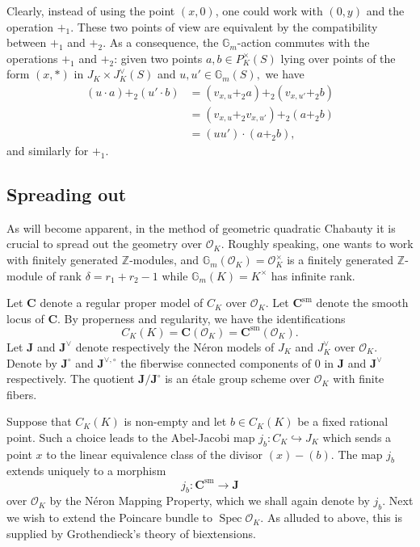 \documentclass[11pt,oneside]{amsart}
\theoremstyle{plain}
\theoremstyle{definition}
\def\G{{\bf G}}
\DeclareMathOperator{\sm}{sm}
\DeclareMathOperator{\spec}{Spec} \DeclareMathOperator{\sgn}{sign}
\def\Z{\mathbb{Z}}
\def\J{\mathbf{J}}
\def\Jo{\mathbf{J}^{\vee,\circ}}
\def\G{\mathbb{G}}
\def\CC{\mathbf{C}}
\def\oh{\mathcal{O}}
\begin{document}
Clearly, instead of using the point $(x, 0)$, one could work with $(0, y)$ and the operation $+_1$. These two points of view are equivalent by the compatibility between $+_1$ and $+_2$. As a consequence, the $\G_m$-action commutes with the operations $+_1$ and $+_2$: given two points $a, b \in P_K^{\times}(S)$ lying over points of the form $(x, *)$ in $J_K\times J_K^{\vee}(S)$ %
and $u, u' \in \G_m(S),$ we have
\begin{align*}
(u \cdot a)+_2(u' \cdot b)& = (v_{x, u}+_2 a)+_2(v_{x, u'}+_2 b)\\
& =(v_{x, u}+_2v_{x, u'})+_2(a+_2b) \\
& =(uu') \cdot (a+_2b),
\end{align*}
and similarly for $+_1$.
  
 





\subsection{Spreading out}\label{s:spread}

As will become apparent, in the method of geometric quadratic Chabauty it is crucial to spread out the geometry over $\oh_K$. Roughly speaking, one wants to work with finitely generated $\Z$-modules, and $\G_m(\oh_K)=\oh_K^\times$  is a finitely generated $\Z$-module of rank $\delta=r_1+r_2-1$ while $\G_m(K)=K^\times$ has infinite rank. 

Let $\CC$ denote a regular proper model of $C_K$ over $\oh_K$. Let $\CC^{\sm}$ denote the smooth locus of $\CC$. %
By properness and regularity, we have the identifications 
$$    C_K(K)=\CC(\oh_K)=\CC^{\sm}(\oh_K) .$$
Let $\J$ and $\J^{\vee}$ denote respectively the N\'eron models of $J_K$ and $J_K^{\vee}$ over $\oh_K$. Denote by $\J^{\circ}$ and $\Jo$ the fiberwise connected components of $0$ in $\J$ and $\J^{\vee}$ respectively. The quotient $\J/\J^{\circ}$ is an \'etale group scheme over $\oh_K$ with finite fibers. 

Suppose that $C_K(K)$ is non-empty and let $b\in C_K(K)$ be a fixed  rational point. Such a choice leads to the Abel-Jacobi map $j_b : C_K\hookrightarrow J_K$ which sends a point $x$ to the linear equivalence class of the divisor $(x)-(b)$.
The map $j_b$ extends uniquely to a morphism 
   $$ j_b: \CC^{\text{sm}}\rightarrow \J $$
over $\oh_K$ by the N\'eron Mapping Property, which we shall again denote by $j_b$. Next we wish to extend the Poincare bundle to $\spec \oh_K$. As alluded to above, this is supplied by Grothendieck's theory of biextensions. 
\end{document}
